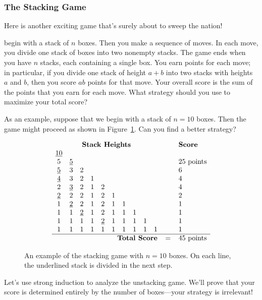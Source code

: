 \subsubsection{The Stacking Game}

Here is another exciting game that's surely about to sweep the
nation!

 begin with a stack of $n$ boxes.  Then you
make a sequence of moves.  In each move, you divide one stack of boxes
into two nonempty stacks.  The game ends when you have $n$ stacks, each
containing a single box.  You earn points for each move; in particular, if
you divide one stack of height $a + b$ into two stacks with heights $a$
and $b$, then you score $ab$ points for that move.  Your overall score is
the sum of the points that you earn for each move.  What strategy should
you use to maximize your total score?

As an example, suppose that we begin with a stack of $n = 10$ boxes.
Then the game might proceed as shown in Figure~\ref{fig:stacking-10}.
Can you find a better strategy?
\begin{figure}%
\[
\begin{array}{cccccccccccl}
\multicolumn{10}{c}{\textbf{Stack Heights}} & \quad & \textbf{Score} \\
\underline{10}&&&&&&&&& && \\
5&\underline{5}&&&&&&&& && 25 \text{ points} \\
\underline{5}&3&2&&&&&&& && 6 \\
\underline{4}&3&2&1&&&&&& && 4 \\
2&\underline{3}&2&1&2&&&&& && 4 \\
\underline{2}&2&2&1&2&1&&&& && 2 \\
1&\underline{2}&2&1&2&1&1&&& && 1 \\
1&1&\underline{2}&1&2&1&1&1&& && 1 \\
1&1&1&1&\underline{2}&1&1&1&1& && 1 \\
1&1&1&1&1&1&1&1&1&1 && 1 \\ \hline
\multicolumn{10}{r}{\textbf{Total Score}} & = & 45 \text{ points}
\end{array}
\]
\caption{An example of the stacking game with $n = 10$ boxes.  On each
line, the underlined stack is divided in the next step.}
\label{fig:stacking-10}
\end{figure}

Let's use strong induction to analyze the unstacking game.  We'll prove
that your score is determined entirely by the number of boxes---your
strategy is irrelevant!

